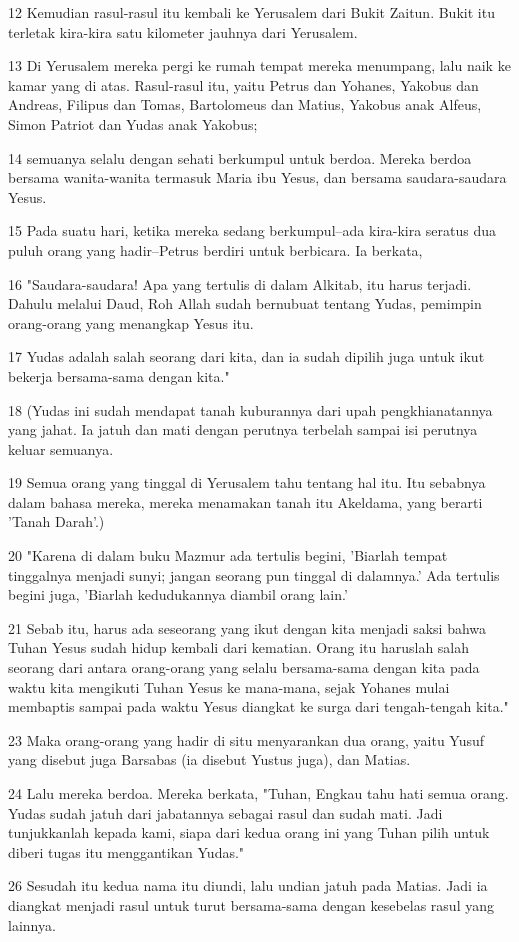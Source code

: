 \par 12 Kemudian rasul-rasul itu kembali ke Yerusalem dari Bukit Zaitun. Bukit itu terletak kira-kira satu kilometer jauhnya dari Yerusalem.
\par 13 Di Yerusalem mereka pergi ke rumah tempat mereka menumpang, lalu naik ke kamar yang di atas. Rasul-rasul itu, yaitu Petrus dan Yohanes, Yakobus dan Andreas, Filipus dan Tomas, Bartolomeus dan Matius, Yakobus anak Alfeus, Simon Patriot dan Yudas anak Yakobus;
\par 14 semuanya selalu dengan sehati berkumpul untuk berdoa. Mereka berdoa bersama wanita-wanita termasuk Maria ibu Yesus, dan bersama saudara-saudara Yesus.
\par 15 Pada suatu hari, ketika mereka sedang berkumpul--ada kira-kira seratus dua puluh orang yang hadir--Petrus berdiri untuk berbicara. Ia berkata,
\par 16 "Saudara-saudara! Apa yang tertulis di dalam Alkitab, itu harus terjadi. Dahulu melalui Daud, Roh Allah sudah bernubuat tentang Yudas, pemimpin orang-orang yang menangkap Yesus itu.
\par 17 Yudas adalah salah seorang dari kita, dan ia sudah dipilih juga untuk ikut bekerja bersama-sama dengan kita."
\par 18 (Yudas ini sudah mendapat tanah kuburannya dari upah pengkhianatannya yang jahat. Ia jatuh dan mati dengan perutnya terbelah sampai isi perutnya keluar semuanya.
\par 19 Semua orang yang tinggal di Yerusalem tahu tentang hal itu. Itu sebabnya dalam bahasa mereka, mereka menamakan tanah itu Akeldama, yang berarti 'Tanah Darah'.)
\par 20 "Karena di dalam buku Mazmur ada tertulis begini, 'Biarlah tempat tinggalnya menjadi sunyi; jangan seorang pun tinggal di dalamnya.' Ada tertulis begini juga, 'Biarlah kedudukannya diambil orang lain.'
\par 21 Sebab itu, harus ada seseorang yang ikut dengan kita menjadi saksi bahwa Tuhan Yesus sudah hidup kembali dari kematian. Orang itu haruslah salah seorang dari antara orang-orang yang selalu bersama-sama dengan kita pada waktu kita mengikuti Tuhan Yesus ke mana-mana, sejak Yohanes mulai membaptis sampai pada waktu Yesus diangkat ke surga dari tengah-tengah kita."
\par 23 Maka orang-orang yang hadir di situ menyarankan dua orang, yaitu Yusuf yang disebut juga Barsabas (ia disebut Yustus juga), dan Matias.
\par 24 Lalu mereka berdoa. Mereka berkata, "Tuhan, Engkau tahu hati semua orang. Yudas sudah jatuh dari jabatannya sebagai rasul dan sudah mati. Jadi tunjukkanlah kepada kami, siapa dari kedua orang ini yang Tuhan pilih untuk diberi tugas itu menggantikan Yudas."
\par 26 Sesudah itu kedua nama itu diundi, lalu undian jatuh pada Matias. Jadi ia diangkat menjadi rasul untuk turut bersama-sama dengan kesebelas rasul yang lainnya.

